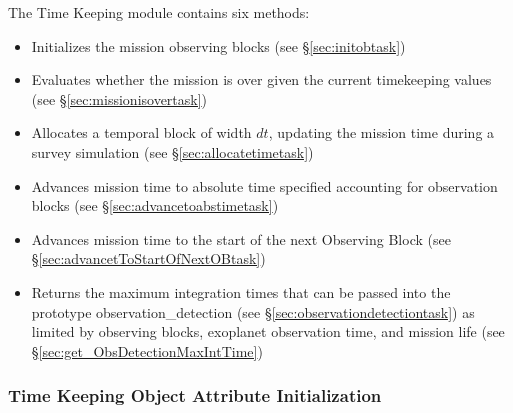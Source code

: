 \documentclass[cleanfoot]{asme2ej}
\newcommand{\reffig}[1]{Figure \ref{#1}}
\begin{document}
The Time Keeping module contains six methods:
\begin{itemize}[leftmargin=1.5in,font={\ttfamily}]
    \item[\texttt init\_OB] Initializes the mission observing blocks (see \S\ref{sec:initobtask})
    \item[\texttt mission\_is\_over] Evaluates whether the mission is over given the current timekeeping values (see \S\ref{sec:missionisovertask})
    \item[\texttt allocate\_time] Allocates a temporal block of width $dt$, updating the mission time during a survey simulation (see \S\ref{sec:allocatetimetask})
    \item[\texttt advanceToAbsTime] Advances mission time to absolute time specified accounting for observation blocks (see \S\ref{sec:advancetoabstimetask})
    \item[\texttt advancetToStartOfNextOB] Advances mission time to the start of the next Observing Block (see \S\ref{sec:advancetToStartOfNextOBtask})
    \item[\texttt get\_ObsDetectionMaxIntTime] Returns the maximum integration times that can be passed into the prototype observation\_detection (see \S\ref{sec:observationdetectiontask}) as limited by observing blocks, exoplanet observation time, and mission life (see \S\ref{sec:get_ObsDetectionMaxIntTime})
\end{itemize}


\subsubsection{Time Keeping Object Attribute Initialization}
\end{document}
